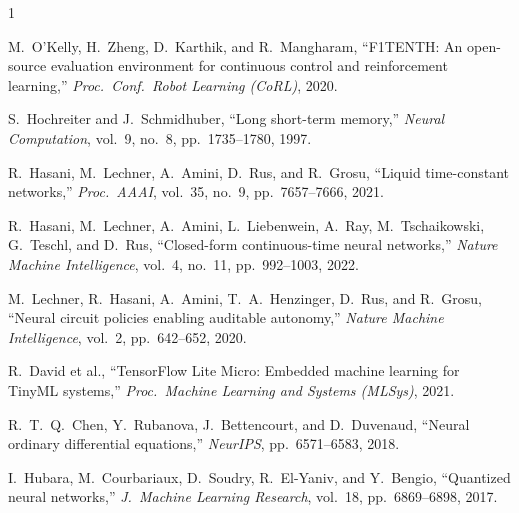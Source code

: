 \documentclass[lettersize,journal]{IEEEtran}
\begin{document}
\begin{thebibliography}{1}


M.\ O'Kelly, H.\ Zheng, D.\ Karthik, and R.\ Mangharam, ``F1TENTH: An open-source evaluation environment for continuous control and reinforcement learning,'' \textit{Proc.\ Conf.\ Robot Learning (CoRL)}, 2020.

S.\ Hochreiter and J.\ Schmidhuber, ``Long short-term memory,'' \textit{Neural Computation}, vol.\ 9, no.\ 8, pp.\ 1735--1780, 1997.

R.\ Hasani, M.\ Lechner, A.\ Amini, D.\ Rus, and R.\ Grosu, ``Liquid time-constant networks,'' \textit{Proc.\ AAAI}, vol.\ 35, no.\ 9, pp.\ 7657--7666, 2021.

R.\ Hasani, M.\ Lechner, A.\ Amini, L.\ Liebenwein, A.\ Ray, M.\ Tschaikowski, G.\ Teschl, and D.\ Rus, ``Closed-form continuous-time neural networks,'' \textit{Nature Machine Intelligence}, vol.\ 4, no.\ 11, pp.\ 992--1003, 2022.

M.\ Lechner, R.\ Hasani, A.\ Amini, T.\ A.\ Henzinger, D.\ Rus, and R.\ Grosu, ``Neural circuit policies enabling auditable autonomy,'' \textit{Nature Machine Intelligence}, vol.\ 2, pp.\ 642--652, 2020.

R.\ David et al., ``TensorFlow Lite Micro: Embedded machine learning for TinyML systems,'' \textit{Proc.\ Machine Learning and Systems (MLSys)}, 2021.

R.\ T.\ Q.\ Chen, Y.\ Rubanova, J.\ Bettencourt, and D.\ Duvenaud, ``Neural ordinary differential equations,'' \textit{NeurIPS}, pp.\ 6571--6583, 2018.

I.\ Hubara, M.\ Courbariaux, D.\ Soudry, R.\ El-Yaniv, and Y.\ Bengio, ``Quantized neural networks,'' \textit{J.\ Machine Learning Research}, vol.\ 18, pp.\ 6869--6898, 2017.

\end{thebibliography}
\end{document}
